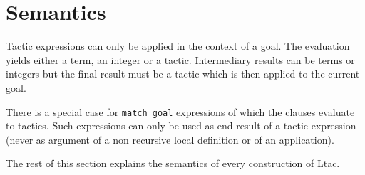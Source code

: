 \section{Semantics}

Tactic expressions can only be applied in the context of a goal.  The
evaluation yields either a term, an integer or a tactic. Intermediary
results can be terms or integers but the final result must be a tactic
which is then applied to the current goal.

There is a special case for {\tt match goal} expressions of which
the clauses evaluate to tactics. Such expressions can only be used as
end result of a tactic expression (never as argument of a non recursive local
definition or of an application).

The rest of this section explains the semantics of every construction
of Ltac.




